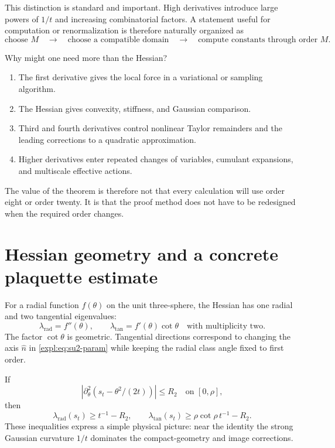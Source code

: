 \documentclass[11pt]{article}
\theoremstyle{definition}
\newcommand{\abs}[1]{\left|#1\right|}
\begin{document}
This distinction is standard and important.  High derivatives introduce
large powers of $1/t$ and increasing combinatorial factors.  A statement
useful for computation or renormalization is therefore naturally organized
as
\[
 \text{choose }M
 \quad\longrightarrow\quad
 \text{choose a compatible domain}
 \quad\longrightarrow\quad
 \text{compute constants through order }M.
\]

Why might one need more than the Hessian?
\begin{enumerate}
\item The first derivative gives the local force in a variational or sampling
algorithm.
\item The Hessian gives convexity, stiffness, and Gaussian comparison.
\item Third and fourth derivatives control nonlinear Taylor remainders and
the leading corrections to a quadratic approximation.
\item Higher derivatives enter repeated changes of variables, cumulant
expansions, and multiscale effective actions.
\end{enumerate}

The value of the theorem is therefore not that every calculation will use
order eight or order twenty.  It is that the proof method does not have to be
redesigned when the required order changes.

\section{Hessian geometry and a concrete plaquette estimate}

For a radial function $f(\theta)$ on the unit three-sphere, the Hessian has
one radial and two tangential eigenvalues:
\begin{equation}\label{expl:eq:hessian-eigenvalues}
 \lambda_{\mathrm{rad}}=f''(\theta),
 \qquad
 \lambda_{\mathrm{tan}}=f'(\theta)\cot\theta
 \quad\text{with multiplicity two}.
\end{equation}
The factor $\cot\theta$ is geometric.  Tangential directions correspond to
changing the axis $\widehat n$ in \eqref{expl:eq:su2-param} while keeping the
radial class angle fixed to first order.

If
\[
 \abs{\partial_\theta^2(s_t-\theta^2/(2t))}\le R_2
 \quad\text{on }[0,\rho],
\]
then
\begin{equation}\label{expl:eq:convexity}
 \lambda_{\mathrm{rad}}(s_t)\ge t^{-1}-R_2,
 \qquad
 \lambda_{\mathrm{tan}}(s_t)
 \ge\rho\cot\rho\,t^{-1}-R_2.
\end{equation}
These inequalities express a simple physical picture: near the identity the
strong Gaussian curvature $1/t$ dominates the compact-geometry and image
corrections.
\end{document}
